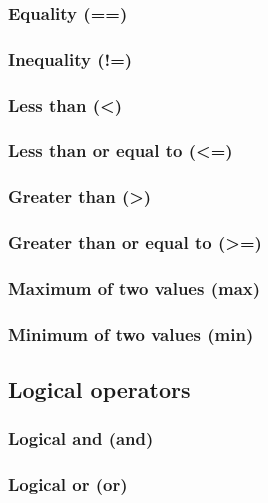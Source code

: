 \documentclass{article}
\theoremstyle{definition}
\begin{document}
\subsubsection{Equality (==)}

\subsubsection{Inequality (!=)}

\subsubsection{Less than (<)}

\subsubsection{Less than or equal to (<=)}

\subsubsection{Greater than (>)}

\subsubsection{Greater than or equal to (>=)}

\subsubsection{Maximum of two values (max)}

\subsubsection{Minimum of two values (min)}

\subsection{Logical operators}

\subsubsection{Logical and (and)}

\subsubsection{Logical or (or)}
\end{document}
